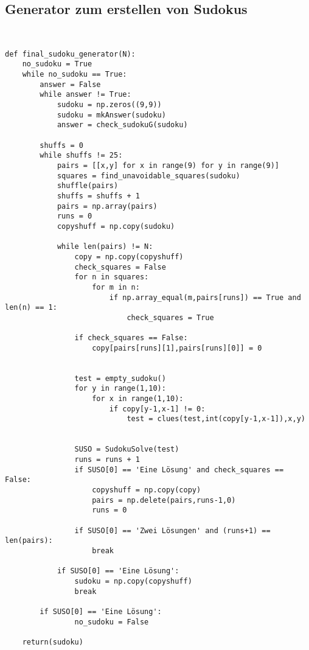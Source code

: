 \documentclass[11pt,a4paper]{article}
\begin{document}
\subsection{Generator zum erstellen von Sudokus}
\ \\
\begin{verbatim}
def final_sudoku_generator(N):
    no_sudoku = True
    while no_sudoku == True:
        answer = False
        while answer != True:
            sudoku = np.zeros((9,9))
            sudoku = mkAnswer(sudoku)
            answer = check_sudokuG(sudoku)
        
        shuffs = 0
        while shuffs != 25:
            pairs = [[x,y] for x in range(9) for y in range(9)]
            squares = find_unavoidable_squares(sudoku)
            shuffle(pairs)
            shuffs = shuffs + 1
            pairs = np.array(pairs)
            runs = 0
            copyshuff = np.copy(sudoku)
            
            while len(pairs) != N:
                copy = np.copy(copyshuff)
                check_squares = False
                for n in squares:
                    for m in n:
                        if np.array_equal(m,pairs[runs]) == True and len(n) == 1:
                            check_squares = True
                        
                if check_squares == False:
                    copy[pairs[runs][1],pairs[runs][0]] = 0
                        
                        
                test = empty_sudoku()
                for y in range(1,10):
                    for x in range(1,10):
                        if copy[y-1,x-1] != 0:
                            test = clues(test,int(copy[y-1,x-1]),x,y)
                        
            
                SUSO = SudokuSolve(test)
                runs = runs + 1
                if SUSO[0] == 'Eine Lösung' and check_squares == False:
                    copyshuff = np.copy(copy)
                    pairs = np.delete(pairs,runs-1,0)
                    runs = 0
                    
                if SUSO[0] == 'Zwei Lösungen' and (runs+1) == len(pairs):
                    break
                
            if SUSO[0] == 'Eine Lösung':
                sudoku = np.copy(copyshuff)
                break
            
        if SUSO[0] == 'Eine Lösung':
                no_sudoku = False
    
    return(sudoku)
\end{verbatim}
\ \\
\end{document}
